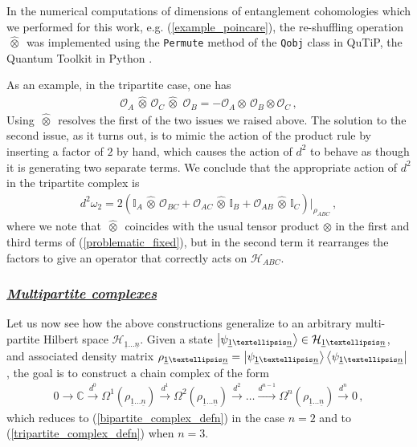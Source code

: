 \documentclass[12pt]{article}
\newcommand{\ul}[1]{{\underline{#1}}}
\newcommand{\wotimes}{ \, \widehat{\otimes} \, }
\numberwithin{equation}{section}
\newcommand{\Honeton}{{\mathcal{H}_{\ul{1} \ldots \ul{n}}}}
\begin{document}
In the numerical computations of dimensions of entanglement cohomologies which we performed for this work, e.g. (\ref{example_poincare}), the re-shuffling operation $\wotimes$ was implemented using the \texttt{Permute} method of the \texttt{Qobj} class in QuTiP, the Quantum Toolkit in Python \cite{Johansson:2011jer,Johansson:2012qtx}.

As an example, in the tripartite case, one has
%
\begin{align}
    \mathcal{O}_A \wotimes \mathcal{O}_C \wotimes \, \mathcal{O}_B = - \mathcal{O}_A \otimes \, \mathcal{O}_B \otimes \mathcal{O}_C \, , 
\end{align}
%
Using $\wotimes$ resolves the first of the two issues we raised above. The solution to the second issue, as it turns out, is to mimic the action of the product rule by inserting a factor of $2$ by hand, which causes the action of $d^2$ to behave as though it is generating two separate terms. We conclude that the appropriate action of $d^2$ in the tripartite complex is
%
\begin{align}\label{problematic_fixed}
    d^2 \omega_2 = 2 \left( \mathbb{I}_A \wotimes \mathcal{O}_{BC} + \mathcal{O}_{AC} \wotimes \mathbb{I}_B + \mathcal{O}_{AB} \wotimes \mathbb{I}_C \right) \big\vert_{\rho_{ABC}} \, ,
\end{align}
%
where we note that $\wotimes$ coincides with the usual tensor product $\otimes$ in the first and third terms of (\ref{problematic_fixed}), but in the second term it rearranges the factors to give an operator that correctly acts on $\mathcal{H}_{ABC}$. 

\subsubsection*{\ul{\it Multipartite complexes}}

Let us now see how the above constructions generalize to an arbitrary multi-partite Hilbert space $\Honeton$. Given a state $\ket{\psi_{\ul{1} \ldots \ul{n}}} \in \Honeton$, and associated density matrix $\rho_{\ul{1} \ldots \ul{n}} = \ket{\psi_{\ul{1} \ldots \ul{n}}} \bra{\psi_{\ul{1} \ldots \ul{n}}}$, the goal is to construct a chain complex of the form
%
\begin{align}\label{general_npartite_complex}
    0 \xrightarrow{\; \;} \mathbb{C} \xrightarrow{d^0} \Omega^1 \left( \rho_{\ul{1} \ldots \ul{n}} \right) \xrightarrow{d^1} \Omega^2 \left( \rho_{\ul{1} \ldots \ul{n}} \right) \xrightarrow{d^2} \ldots \xrightarrow{d^{n-1}} \Omega^n \left( \rho_{\ul{1} \ldots \ul{n}} \right) \xrightarrow{d^{n}} 0 \, ,
\end{align}
%
which reduces to (\ref{bipartite_complex_defn}) in the case $n = 2$ and to (\ref{tripartite_complex_defn}) when $n = 3$.
\end{document}

